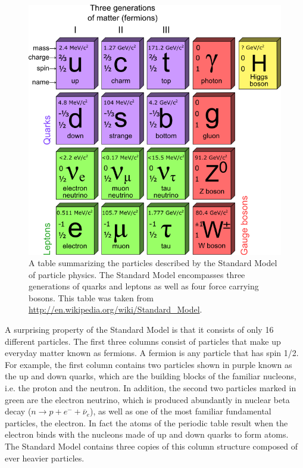 \begin{figure}[htbp]
    \centering
    \includegraphics[scale=0.4, angle=0]{./figures/StandardModelPNG}
    \caption{A table summarizing the particles described by the
    Standard Model of particle physics. The Standard Model encompasses
    three generations of quarks and leptons as well as four force carrying
    bosons. This table was taken from
    \url{http://en.wikipedia.org/wiki/Standard_Model}.}
    \label{fig:sm}
\end{figure}

A surprising property of the Standard Model is that it consists
of only 16 different particles. The first three columns consist of particles
that make up everyday matter known as fermions. A fermion is any particle that
has spin 1/2. 
For example, the first column contains two particles shown in purple known as
the up and down quarks, which are the building blocks of the familiar nucleons, 
i.e. the proton and the neutron. 
In addition, the second two particles marked in green
are the electron neutrino, which is produced abundantly in nuclear beta decay
($n \to p + e^- + \bar{\nu}_e$), as well as one of the most familiar fundamental
particles, the electron. In fact the atoms of the periodic table result when
the electron binds with the nucleons made of up and down quarks to form atoms. 
The Standard Model contains
three copies of this column structure composed of ever heavier particles.

